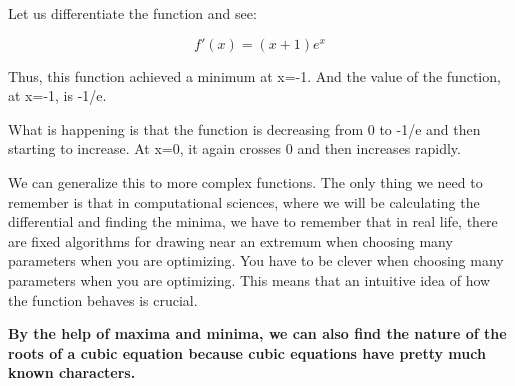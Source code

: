 \begin{enumerate}
Let us differentiate the function and see:

$$f'(x)= (x+1)e^x$$

Thus, this function achieved a minimum at x=-1. And the value of the function, at x=-1, is -1/e.

What is happening is that the function is decreasing from 0 to -1/e and then starting to increase. At x=0, it again crosses 0 and then increases rapidly.



\end{enumerate}

We can generalize this to more complex functions. The only thing we need to remember is that in computational sciences, where we will be calculating the differential and finding the minima, we have to remember that in real life, there are fixed algorithms for drawing near an extremum when choosing many parameters when you are optimizing. You have to be clever when choosing many parameters when you are optimizing. This means that an intuitive idea of how the function behaves is crucial. 

\textbf{By the help of maxima and minima, we can also find the nature of the roots of a cubic equation because cubic equations have pretty much known characters.}


